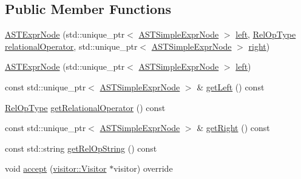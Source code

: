 \subsection*{Public Member Functions}
\begin{DoxyCompactItemize}
\item 
\hyperlink{classparser_1_1ast_1_1ASTExprNode_a591850e9f50fcbb6f8d97f3a40a3a2ba}{A\+S\+T\+Expr\+Node} (std\+::unique\+\_\+ptr$<$ \hyperlink{classparser_1_1ast_1_1ASTSimpleExprNode}{A\+S\+T\+Simple\+Expr\+Node} $>$ \hyperlink{classparser_1_1ast_1_1ASTExprNode_aa7250732754b829ca100d4ce35a021b0}{left}, \hyperlink{ASTExprNode_8h_ade5793e91a548ec55c1a8e776984297a}{Rel\+Op\+Type} \hyperlink{classparser_1_1ast_1_1ASTExprNode_a45fa00b5859baeb11b6976b145b5966e}{relational\+Operator}, std\+::unique\+\_\+ptr$<$ \hyperlink{classparser_1_1ast_1_1ASTSimpleExprNode}{A\+S\+T\+Simple\+Expr\+Node} $>$ \hyperlink{classparser_1_1ast_1_1ASTExprNode_a26f40099c4e3848ba0ed00388d507d72}{right})
\item 
\hyperlink{classparser_1_1ast_1_1ASTExprNode_a1716bec11dcf773ef5090c13fa7e8020}{A\+S\+T\+Expr\+Node} (std\+::unique\+\_\+ptr$<$ \hyperlink{classparser_1_1ast_1_1ASTSimpleExprNode}{A\+S\+T\+Simple\+Expr\+Node} $>$ \hyperlink{classparser_1_1ast_1_1ASTExprNode_aa7250732754b829ca100d4ce35a021b0}{left})
\item 
const std\+::unique\+\_\+ptr$<$ \hyperlink{classparser_1_1ast_1_1ASTSimpleExprNode}{A\+S\+T\+Simple\+Expr\+Node} $>$ \& \hyperlink{classparser_1_1ast_1_1ASTExprNode_a19ec44a2b2a38635c6e9cf7fa398fb76}{get\+Left} () const
\item 
\hyperlink{ASTExprNode_8h_ade5793e91a548ec55c1a8e776984297a}{Rel\+Op\+Type} \hyperlink{classparser_1_1ast_1_1ASTExprNode_af4efd2fc330c3fa5da59334b9db9b104}{get\+Relational\+Operator} () const
\item 
const std\+::unique\+\_\+ptr$<$ \hyperlink{classparser_1_1ast_1_1ASTSimpleExprNode}{A\+S\+T\+Simple\+Expr\+Node} $>$ \& \hyperlink{classparser_1_1ast_1_1ASTExprNode_a23aad8e7397e524848446e9bdcdc4141}{get\+Right} () const
\item 
const std\+::string \hyperlink{classparser_1_1ast_1_1ASTExprNode_a3e781b545bb07447252f265a06f94b93}{get\+Rel\+Op\+String} () const
\item 
void \hyperlink{classparser_1_1ast_1_1ASTExprNode_a3eea258af04a74930acc0c9fb6aade77}{accept} (\hyperlink{classvisitor_1_1Visitor}{visitor\+::\+Visitor} $\ast$visitor) override
\end{DoxyCompactItemize}
